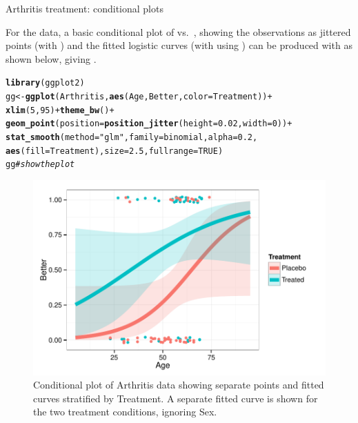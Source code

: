 \documentclass[11pt]{book}\usepackage[]{graphicx}\usepackage[]{color}
\makeatletter
\newcommand{\hlnum}[1]{\textcolor[rgb]{0.686,0.059,0.569}{#1}}%
\newcommand{\hlstr}[1]{\textcolor[rgb]{0.192,0.494,0.8}{#1}}%
\newcommand{\hlcom}[1]{\textcolor[rgb]{0.678,0.584,0.686}{\textit{#1}}}%
\newcommand{\hlopt}[1]{\textcolor[rgb]{0,0,0}{#1}}%
\newcommand{\hlstd}[1]{\textcolor[rgb]{0.345,0.345,0.345}{#1}}%
\newcommand{\hlkwb}[1]{\textcolor[rgb]{0.69,0.353,0.396}{#1}}%
\newcommand{\hlkwc}[1]{\textcolor[rgb]{0.333,0.667,0.333}{#1}}%
\newcommand{\hlkwd}[1]{\textcolor[rgb]{0.737,0.353,0.396}{\textbf{#1}}}%
\newenvironment{kframe}{%
 \def\at@end@of@kframe{}%
 \ifinner\ifhmode%
  \def\at@end@of@kframe{\end{minipage}}%
  \begin{minipage}{\columnwidth}%
 \fi\fi%
 \def\FrameCommand##1{\hskip\@totalleftmargin \hskip-\fboxsep
 \colorbox{shadecolor}{##1}\hskip-\fboxsep
     \hskip-\linewidth \hskip-\@totalleftmargin \hskip\columnwidth}%
 \MakeFramed {\advance\hsize-\width
   \@totalleftmargin\z@ \linewidth\hsize
   \@setminipage}}%
 {\par\unskip\endMakeFramed%
 \at@end@of@kframe}
\newenvironment{knitrout}{}{} %
\renewenvironment{knitrout}{\small\renewcommand{\baselinestretch}{.85}}{} %
\makeatother
\begin{document}
\begin{Example}{Arthritis treatment: conditional plots}

For the  data, a basic conditional plot of  vs.\ ,
showing the observations as jittered points (with )
and the fitted logistic curves (with  using )
can be produced with  as shown below, giving .
\begin{knitrout}
\color{fgcolor}\begin{kframe}
\begin{alltt}
\hlkwd{library}\hlstd{(ggplot2)}
\hlstd{gg} \hlkwb{<-} \hlkwd{ggplot}\hlstd{(Arthritis,} \hlkwd{aes}\hlstd{(Age, Better,} \hlkwc{color}\hlstd{=Treatment))} \hlopt{+}
  \hlkwd{xlim}\hlstd{(}\hlnum{5}\hlstd{,} \hlnum{95}\hlstd{)} \hlopt{+} \hlkwd{theme_bw}\hlstd{()} \hlopt{+}
  \hlkwd{geom_point}\hlstd{(}\hlkwc{position} \hlstd{=} \hlkwd{position_jitter}\hlstd{(}\hlkwc{height} \hlstd{=} \hlnum{0.02}\hlstd{,} \hlkwc{width} \hlstd{=} \hlnum{0}\hlstd{))} \hlopt{+}
  \hlkwd{stat_smooth}\hlstd{(}\hlkwc{method} \hlstd{=} \hlstr{"glm"}\hlstd{,} \hlkwc{family} \hlstd{= binomial,} \hlkwc{alpha} \hlstd{=} \hlnum{0.2}\hlstd{,}
              \hlkwd{aes}\hlstd{(}\hlkwc{fill}\hlstd{=Treatment),} \hlkwc{size}\hlstd{=}\hlnum{2.5}\hlstd{,} \hlkwc{fullrange}\hlstd{=}\hlnum{TRUE}\hlstd{)}
\hlstd{gg}   \hlcom{# show the plot}
\end{alltt}
\end{kframe}\begin{figure}[!htbp]


\centerline{\includegraphics[width=.6\textwidth]{ch07/fig/arth-cond1-1} }

\caption[Conditional plot of Arthritis data showing separate points and fitted curves stratified by Treatment]{Conditional plot of Arthritis data showing separate points and fitted curves stratified by Treatment. A separate fitted curve is shown for the two treatment conditions, ignoring Sex.\label{fig:arth-cond1}}
\end{figure}



\end{knitrout}
\end{Example}
\end{document}
